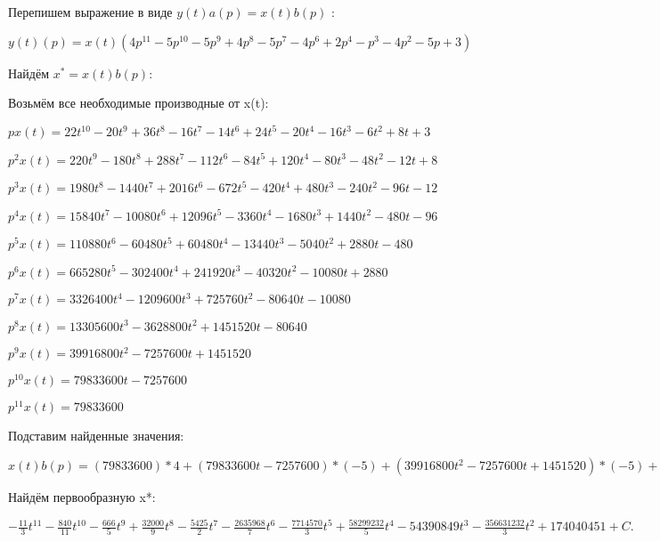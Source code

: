 \documentclass{article}
\begin{document}
{{{{{Перепишем выражение в виде $y(t)a(p)=x(t)b(p)$ :

$y(t)(p)=x(t)(4p^{11}-5p^{10}-5p^{9}+4p^{8}-5p^{7}-4p^{6}+2p^{4}-p^{3}-4p^{2}-5p+3)$

Найдём $x^*=x(t)b(p)$:

Возьмём все необходимые производные от x(t):

$px(t)=22t^{10}-20t^{9}+36t^{8}-16t^{7}-14t^{6}+24t^{5}-20t^{4}-16t^{3}-6t^{2}+8t+3$

$p^2x(t)=220t^{9}-180t^{8}+288t^{7}-112t^{6}-84t^{5}+120t^{4}-80t^{3}-48t^{2}-12t+8$

$p^3x(t)=1980t^{8}-1440t^{7}+2016t^{6}-672t^{5}-420t^{4}+480t^{3}-240t^{2}-96t-12$

$p^4x(t)=15840t^{7}-10080t^{6}+12096t^{5}-3360t^{4}-1680t^{3}+1440t^{2}-480t-96$

$p^5x(t)=110880t^{6}-60480t^{5}+60480t^{4}-13440t^{3}-5040t^{2}+2880t-480$

$p^6x(t)=665280t^{5}-302400t^{4}+241920t^{3}-40320t^{2}-10080t+2880$

$p^7x(t)=3326400t^{4}-1209600t^{3}+725760t^{2}-80640t-10080$

$p^8x(t)=13305600t^{3}-3628800t^{2}+1451520t-80640$

$p^9x(t)=39916800t^{2}-7257600t+1451520$

$p^10x(t)=79833600t-7257600$

$p^11x(t)=79833600$

Подставим найденные значения:

$x(t)b(p) = (79833600)*4+(79833600t-7257600)*(-5)+(39916800t^{2}-7257600t+1451520)*(-5)+(13305600t^{3}-3628800t^{2}+1451520t-80640)*4+(3326400t^{4}-1209600t^{3}+725760t^{2}-80640t-10080)*(-5)+(665280t^{5}-302400t^{4}+241920t^{3}-40320t^{2}-10080t+2880)*(-4)+(15840t^{7}-10080t^{6}+12096t^{5}-3360t^{4}-1680t^{3}+1440t^{2}-480t-96)*2+(1980t^{8}-1440t^{7}+2016t^{6}-672t^{5}-420t^{4}+480t^{3}-240t^{2}-96t-12)*(-1)+(220t^{9}-180t^{8}+288t^{7}-112t^{6}-84t^{5}+120t^{4}-80t^{3}-48t^{2}-12t+8)*(-4)+(22t^{10}-20t^{9}+36t^{8}-16t^{7}-14t^{6}+24t^{5}-20t^{4}-16t^{3}-6t^{2}+8t+3)*(-5)+(22t^{10}-20t^{9}+36t^{8}-16t^{7}-14t^{6}+24t^{5}-20t^{4}-16t^{3}-6t^{2}+8t+3)*3=-44t^{10}-840t^{9}-1332t^{8}+32000t^{7}-21700t^{6}-2635968t^{5}-15429140t^{4}+58299232t^{3}-217563396t^{2}-356631232t$





Найдём первообразную x*:

$-\frac{11}{3}t^{11}-\frac{840}{11}t^{10}-\frac{666}{5}t^{9}+\frac{32000}{9}t^{8}-\frac{5425}{2}t^{7}-\frac{2635968}{7}t^{6}-\frac{7714570}{3}t^{5}+\frac{58299232}{5}t^{4}-54390849t^{3}-\frac{356631232}{3}t^{2}+174040451+C.$

}}}}}
\end{document}
